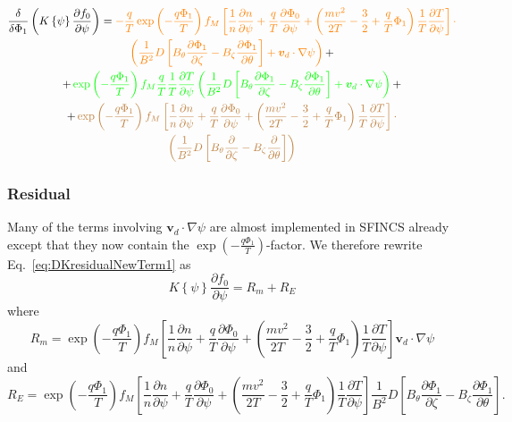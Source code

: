 \documentclass[12pt]{article}
\newcommand{\p}{\partial}
\newcommand{\na}{\nabla}
\begin{document}
\begin{multline}
\frac{\delta}{\delta \Phi_1} \left(K \left\{\psi\right\} \frac{\p f_{0}}{\p \psi}\right) = \textcolor{orange}{
- \frac{q}{T}
 \exp \left(- \frac{q \Phi_1}{T}  \right) f_{M} \left[\frac{1}{n} \frac{\p n}{\p \psi} + \frac{q}{T} \frac{\p \Phi_0}{\p \psi} + \left(\frac{m v^2}{2 T} - \frac{3}{2} + \frac{q}{T} \Phi_1\right) \frac{1}{T} \frac{\p T}{\p \psi}\right] \cdot} \\ \textcolor{orange}{
 \left(\frac{1}{B^2} D \left[B_\theta \frac{\p \Phi_1}{\p \zeta} - B_\zeta \frac{\p \Phi_1}{\p \theta}\right] + \bm{v}_d \cdot \na \psi\right)} \, + \\ + \,\textcolor{green}{
 \exp \left(- \frac{q \Phi_1}{T}  \right) f_{M} \frac{q}{T} \frac{1}{T} \frac{\p T}{\p \psi} \left(\frac{1}{B^2} D \left[B_\theta \frac{\p \Phi_1}{\p \zeta} - B_\zeta \frac{\p \Phi_1}{\p \theta}\right] + \bm{v}_d \cdot \na \psi\right)} \, + \\ + \,
\textcolor{brown}{
 \exp \left(- \frac{q \Phi_1}{T}  \right) f_{M} \left[\frac{1}{n} \frac{\p n}{\p \psi} + \frac{q}{T} \frac{\p \Phi_0}{\p \psi} + \left(\frac{m v^2}{2 T} - \frac{3}{2} + \frac{q}{T} \Phi_1\right) \frac{1}{T} \frac{\p T}{\p \psi}\right] \cdot} \\ \textcolor{brown}{
 \left(\frac{1}{B^2} D \left[B_\theta \frac{\p }{\p \zeta} - B_\zeta \frac{\p }{\p \theta}\right]\right)}
\label{eq:DKJacobianNewTerm1}
\end{multline}

\subsubsection*{Residual}
Many of the terms involving $\bm{v}_d \cdot \na \psi$ are almost implemented in SFINCS already except that they now contain the $\exp \left(- \frac{q \Phi_1}{T}  \right)$-factor. 
We therefore rewrite Eq.~\ref{eq:DKresidualNewTerm1} as 
\begin{equation}
K \left\{\psi\right\} \frac{\p f_{0}}{\p \psi} = R_m + R_E
\label{eq:DKresidualNewTermSplit}
\end{equation}
where
\begin{equation}
R_m = \exp \left(- \frac{q \Phi_1}{T}  \right) f_{M} \left[\frac{1}{n} \frac{\p n}{\p \psi} + \frac{q}{T} \frac{\p \Phi_0}{\p \psi} + \left(\frac{m v^2}{2 T} - \frac{3}{2} + \frac{q}{T} \Phi_1\right) \frac{1}{T} \frac{\p T}{\p \psi}\right] \bm{v}_d \cdot \na \psi
\label{eq:DKresidualNewTermRm}
\end{equation}
and 
\begin{equation}
R_E = \exp \left(- \frac{q \Phi_1}{T}  \right) f_{M} \left[\frac{1}{n} \frac{\p n}{\p \psi} + \frac{q}{T} \frac{\p \Phi_0}{\p \psi} + \left(\frac{m v^2}{2 T} - \frac{3}{2} + \frac{q}{T} \Phi_1\right) \frac{1}{T} \frac{\p T}{\p \psi}\right] \frac{1}{B^2} D \left[B_\theta \frac{\p \Phi_1}{\p \zeta} - B_\zeta \frac{\p \Phi_1}{\p \theta}\right].
\label{eq:DKresidualNewTermRE}
\end{equation}
\end{document}
